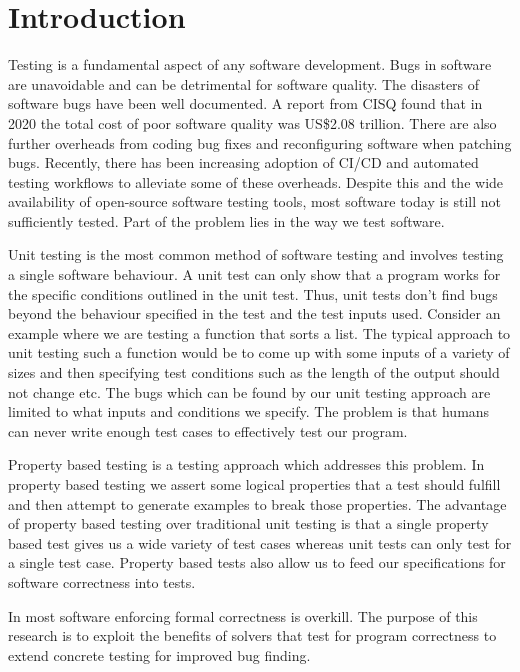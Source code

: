 \chapter{Introduction}
\label{cha:intro}
Testing is a fundamental aspect of any software development. Bugs in software are unavoidable and can be detrimental for software quality. The disasters of software bugs have been well documented. A report from CISQ found that in 2020 the total cost of poor software quality was US\$2.08 trillion. There are also further overheads from coding bug fixes and reconfiguring software when patching bugs. Recently, there has been increasing adoption of CI/CD and automated testing workflows to alleviate some of these overheads. Despite this and the wide availability of open-source software testing tools, most software today is still not sufficiently tested. Part of the problem lies in the way we test software. 

Unit testing is the most common method of software testing and involves testing a single software behaviour. A unit test can only show that a program works for the specific conditions outlined in the unit test. Thus, unit tests don’t find bugs beyond the behaviour specified in the test and the test inputs used. Consider an example where we are testing a function that sorts a list. The typical approach to unit testing such a function would be to come up with some inputs of a variety of sizes and then specifying test conditions such as the length of the output should not change etc. The bugs which can be found by our unit testing approach are limited to what inputs and conditions we specify. The problem is that humans can never write enough test cases to effectively test our program.

Property based testing is a testing approach which addresses this problem. In property based testing we assert some logical properties that a test should fulfill and then attempt to generate examples to break those properties. The advantage of property based testing over traditional unit testing is that a single property based test gives us a wide variety of test cases whereas unit tests can only test for a single test case. Property based tests also allow us to feed our specifications for software correctness into tests. 

In most software enforcing formal correctness is overkill. The purpose of this research is to exploit the benefits of solvers that test for program correctness to extend concrete testing for improved bug finding. 

